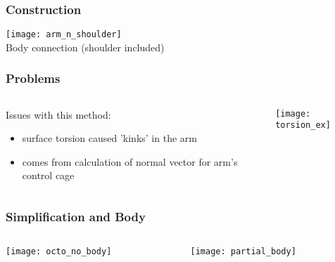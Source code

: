 \documentclass[14pt]{beamer}
\begin{document}
\begin{frame}
\frametitle{Construction}

\begin{center}
\texttt{[image: arm\_n\_shoulder]}\\
Body connection (shoulder included) 

\end{center}

\end{frame}

\begin{frame}
\frametitle{Problems}

\begin{columns}
\begin{column}{0.48\textwidth}
Issues with this method:
\begin{itemize}
\item surface torsion caused 'kinks' in the arm
\item comes from calculation of normal vector for arm's control cage
\end{itemize}
\end{column}

\hfill

\begin{column}{0.48\textwidth}

\begin{center}
\texttt{[image: torsion\_ex]}
\end{center}

\end{column}


\end{columns}

\end{frame}

\begin{frame}
\frametitle{Simplification and Body}


\begin{columns}
\begin{column}{0.48\textwidth}
\begin{center}
\texttt{[image: octo\_no\_body]}
\end{center}
\end{column}

\hfill

\begin{column}{0.48\textwidth}

\begin{center}
\texttt{[image: partial\_body]}
\end{center}

\end{column}


\end{columns}

\end{frame}
\end{document}
